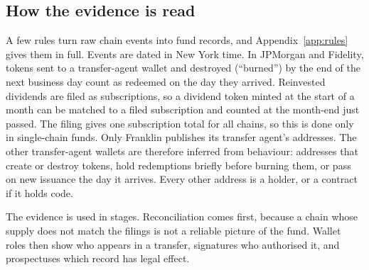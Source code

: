 \documentclass[12pt,a4paper]{article}
\begin{document}
\subsection{How the evidence is read}
A few rules turn raw chain events into fund records, and Appendix~\ref{app:rules} gives them in full. Events are dated in New York time. In JPMorgan and Fidelity, tokens sent to a transfer-agent wallet and destroyed (``burned'') by the end of the next business day count as redeemed on the day they arrived. Reinvested dividends are filed as subscriptions, so a dividend token minted at the start of a month can be matched to a filed subscription and counted at the month-end just passed. The filing gives one subscription total for all chains, so this is done only in single-chain funds. Only Franklin publishes its transfer agent's addresses. The other transfer-agent wallets are therefore inferred from behaviour: addresses that create or destroy tokens, hold redemptions briefly before burning them, or pass on new issuance the day it arrives. Every other address is a holder, or a contract if it holds code.

The evidence is used in stages. Reconciliation comes first, because a chain whose supply does not match the filings is not a reliable picture of the fund. Wallet roles then show who appears in a transfer, signatures who authorised it, and prospectuses which record has legal effect.
\end{document}
